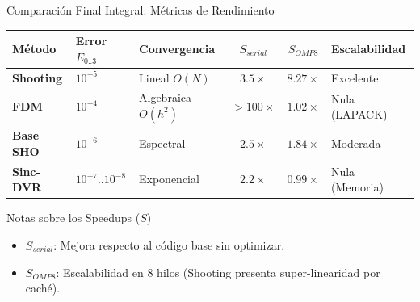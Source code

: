 \documentclass[aspectratio=169,10pt]{beamer}
\begin{document}
\begin{frame}{Comparación Final Integral: Métricas de Rendimiento}

\begin{center}
\small %
\begin{tabular}{lp{1.8cm}p{1.8cm}ccp{2.2cm}}
\toprule
\textbf{Método} & \textbf{Error $E_{0..3}$} & \textbf{Convergencia} & \textbf{$S_{serial}$} & \textbf{$S_{OMP8}$} & \textbf{Escalabilidad}\\
\midrule
\textbf{Shooting} & $10^{-5}$ & Lineal $O(N)$ & $3.5\times$ & $\mathbf{8.27\times}$ & Excelente \\
\midrule
\textbf{FDM} & $10^{-4}$ & Algebraica $O(h^2)$ & $>100\times$ & $1.02\times$ & Nula (LAPACK) \\
\midrule
\textbf{Base SHO} & $10^{-6}$ & Espectral & $2.5\times$ & $1.84\times$ & Moderada \\
\midrule
\textbf{Sinc-DVR} & $10^{-7}..10^{-8}$ & Exponencial & $2.2\times$ & $0.99\times$ & Nula (Memoria) \\
\bottomrule
\end{tabular}
\end{center}

\vspace{0.6cm}
\begin{block}{Notas sobre los Speedups ($S$)}
\footnotesize
\begin{itemize}
    \item $S_{serial}$: Mejora respecto al código base sin optimizar.
    \item $S_{OMP8}$: Escalabilidad en 8 hilos (Shooting presenta super-linearidad por caché).
\end{itemize}
\end{block}

\end{frame}
\end{document}
